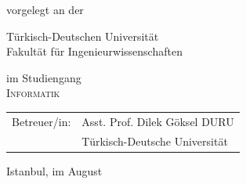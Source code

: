 \begin{titlepage}
\begin{center}
\vspace{0.6cm}

\begin{large}
vorgelegt an der\\ 
\vspace{0.2cm}
\begin{scshape}
Türkisch-Deutschen Universität\\
Fakultät für Ingenieurwissenschaften\\
\end{scshape}
\end{large}

\vspace{0.6cm}

\begin{large}
im Studiengang\\ 
\vspace{0.1cm}
\textsc{Informatik}
\end{large}

\vspace{1.2cm}

\begin{tabular}{rl}
        Betreuer/in:  &  Asst. Prof. Dilek Göksel DURU\\
       					&  \small Türkisch-Deutsche Universität \\[1.0em]
\end{tabular}

\vspace{0.8cm}

\begin{large}
Istanbul, im August \the\year
\end{large}

\end{center}

\newpage
\thispagestyle{empty}


\end{titlepage}
